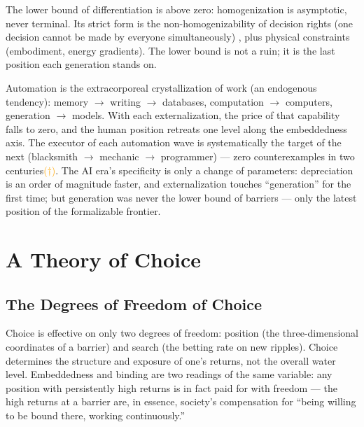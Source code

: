 \documentclass[11pt]{article}
\newcommand{\infmark}{\textcolor{orange}{(\(\dagger\))}}
\begin{document}
The lower bound of differentiation is above zero: homogenization is asymptotic, never terminal. Its strict form is the non-homogenizability of decision rights (one decision cannot be made by everyone simultaneously) \cite{arrow1951,radner1993}, plus physical constraints (embodiment, energy gradients). The lower bound is not a ruin; it is the last position each generation stands on.

Automation is the extracorporeal crystallization of work (an endogenous tendency): memory $\to$ writing $\to$ databases, computation $\to$ computers, generation $\to$ models. With each externalization, the price of that capability falls to zero, and the human position retreats one level along the embeddedness axis. The executor of each automation wave is systematically the target of the next (blacksmith $\to$ mechanic $\to$ programmer) --- zero counterexamples in two centuries\infmark. The AI era's specificity is only a change of parameters: depreciation is an order of magnitude faster, and externalization touches ``generation'' for the first time; but generation was never the lower bound of barriers --- only the latest position of the formalizable frontier.

\section{A Theory of Choice}
\subsection{The Degrees of Freedom of Choice}
Choice is effective on only two degrees of freedom: position (the three-dimensional coordinates of a barrier) and search (the betting rate on new ripples). Choice determines the structure and exposure of one's returns, not the overall water level. Embeddedness and binding are two readings of the same variable: any position with persistently high returns is in fact paid for with freedom --- the high returns at a barrier are, in essence, society's compensation for ``being willing to be bound there, working continuously.''
\end{document}
